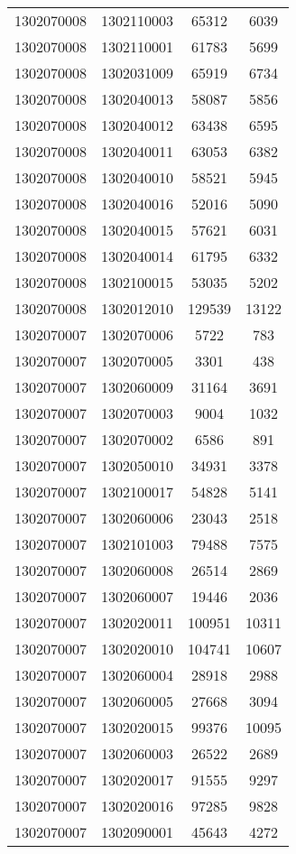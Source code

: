 \begin{longtable}[h]{llcc}
		1302070008 & 1302110003 & 65312 & 6039\\
		1302070008 & 1302110001 & 61783 & 5699\\
		1302070008 & 1302031009 & 65919 & 6734\\
		1302070008 & 1302040013 & 58087 & 5856\\
		1302070008 & 1302040012 & 63438 & 6595\\
		1302070008 & 1302040011 & 63053 & 6382\\
		1302070008 & 1302040010 & 58521 & 5945\\
		1302070008 & 1302040016 & 52016 & 5090\\
		1302070008 & 1302040015 & 57621 & 6031\\
		1302070008 & 1302040014 & 61795 & 6332\\
		1302070008 & 1302100015 & 53035 & 5202\\
		1302070008 & 1302012010 & 129539 & 13122\\
		1302070007 & 1302070006 & 5722 & 783\\
		1302070007 & 1302070005 & 3301 & 438\\
		1302070007 & 1302060009 & 31164 & 3691\\
		1302070007 & 1302070003 & 9004 & 1032\\
		1302070007 & 1302070002 & 6586 & 891\\
		1302070007 & 1302050010 & 34931 & 3378\\
		1302070007 & 1302100017 & 54828 & 5141\\
		1302070007 & 1302060006 & 23043 & 2518\\
		1302070007 & 1302101003 & 79488 & 7575\\
		1302070007 & 1302060008 & 26514 & 2869\\
		1302070007 & 1302060007 & 19446 & 2036\\
		1302070007 & 1302020011 & 100951 & 10311\\
		1302070007 & 1302020010 & 104741 & 10607\\
		1302070007 & 1302060004 & 28918 & 2988\\
		1302070007 & 1302060005 & 27668 & 3094\\
		1302070007 & 1302020015 & 99376 & 10095\\
		1302070007 & 1302060003 & 26522 & 2689\\
		1302070007 & 1302020017 & 91555 & 9297\\
		1302070007 & 1302020016 & 97285 & 9828\\
		1302070007 & 1302090001 & 45643 & 4272\\

\end{longtable}
